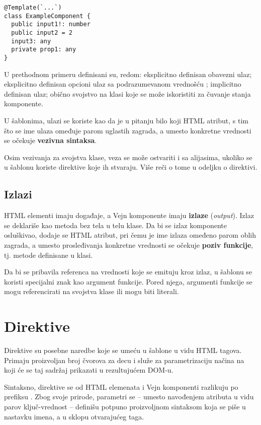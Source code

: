 \begin{verbatim}
@Template(`...`)
class ExampleComponent {
  public input1!: number
  public input2 = 2
  input3: any
  private prop1: any
}
\end{verbatim}

U prethodnom primeru definisani su, redom: eksplicitno definisan obavezni ulaz; eksplicitno definisan opcioni ulaz sa podrazumevanom vrednošću ; implicitno definisan ulaz; obično svojstvo na klasi koje se može iskoristiti za čuvanje stanja komponente.

U šablonima, ulazi se koriste kao da je u pitanju bilo koji HTML atribut, s tim što se ime ulaza omeđuje parom uglastih zagrada, a umesto konkretne vrednosti se očekuje \textbf{vezivna sintaksa}.

Osim vezivanja za svojstva klase, veza se može ostvariti i sa alijasima, ukoliko se u šablonu koriste direktive koje ih stvaraju.
Više reči o tome u odeljku o  direktivi.

\subsection{Izlazi}

HTML elementi imaju događaje, a Vejn komponente imaju \textbf{izlaze} (\textsl{output}).
Izlaz se deklariše kao metoda bez tela u telu klase.
Da bi se izlaz komponente osluškivao, dodaje se HTML atribut, pri čemu je ime izlaza omeđeno parom oblih zagrada, a umesto prosleđivanja konkretne vrednosti se očekuje \textbf{poziv funkcije}, tj. metode definisane u klasi.

Da bi se pribavila referenca na vrednosti koje se emituju kroz izlaz, u šablonu se koristi specijalni znak \code{\#} kao argument funkcije.
Pored njega, argumenti funkcije se mogu referencirati na svojstva klase ili mogu biti literali.

\section{Direktive}

Direktive su posebne naredbe koje se umeću u šablone u vidu HTML tagova.
Primaju proizvoljan broj čvorova za decu i služe za parametrizaciju načina na koji će se taj sadržaj prikazati u rezultujućem DOM-u.

Sintaksno, direktive se od HTML elemenata i Vejn komponenti razlikuju po prefiksu .
Zbog svoje prirode, parametri se -- umesto navođenjem atributa u vidu parov ključ-vrednost -- definišu potpuno proizvoljnom sintaksom koja se piše u nastavku imena, a u sklopu otvarajućeg taga.

